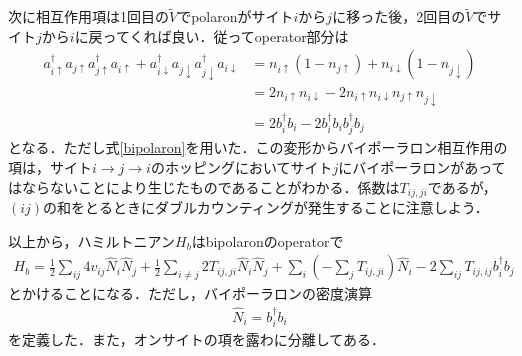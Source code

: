 \documentclass[a4j]{jarticle}
\begin{document}
次に相互作用項は1回目の$\tilde{V}$でpolaronがサイト$i$から$j$に移った後，2回目の$\tilde{V}$でサイト$j$から$i$に戻ってくれば良い．従ってoperator部分は
\begin{align}
  a^{\dagger}_{i\uparrow}a_{j\uparrow} a^{\dagger}_{j\uparrow}a_{i\uparrow}+ a^{\dagger}_{i\downarrow}a_{j\downarrow} a^{\dagger}_{j\downarrow}a_{i\downarrow} 
&=n_{i\uparrow}\left(1-n_{j\uparrow} \right)+ n_{i\downarrow}\left(1-n_{j\downarrow} \right) \\
&=2n_{i\uparrow}n_{i\downarrow}-2n_{i\uparrow}n_{i\downarrow}n_{j\uparrow}n_{j\downarrow} \\
&=2b_i^{\dagger}b_i-2b_i^{\dagger}b_ib_j^{\dagger}b_j
\end{align}
となる．ただし式\eqref{bipolaron}を用いた．この変形からバイポーラロン相互作用の項は，サイト$i\to j\to i$のホッピングにおいてサイト$j$にバイポーラロンがあってはならないことにより生じたものであることがわかる．係数は$T_{ij,ji}$であるが，$(ij)$の和をとるときにダブルカウンティングが発生することに注意しよう．

以上から，ハミルトニアン$H_b$はbipolaronのoperatorで
\begin{align}
 H_b=\frac{1}{2}\sum_{ij}4v_{ij}\hat{N}_{i}\hat{N}_{j}+\frac{1}{2}\sum_{i\neq j}2T_{ij,ji}\hat{N}_{i}\hat{N}_{j}+\sum_{i}\left(-\sum_{j}T_{ij,ji}\right)\hat{N}_{i}-2\sum_{ij}T_{ij,ij}b^{\dagger}_ib_j \label{bipolaron}
\end{align}
とかけることになる．ただし，バイポーラロンの密度演算
\begin{align}
 \hat{N}_i=b^{\dagger}_ib_i
\end{align}
を定義した．また，オンサイトの項を露わに分離してある．


\end{document}
